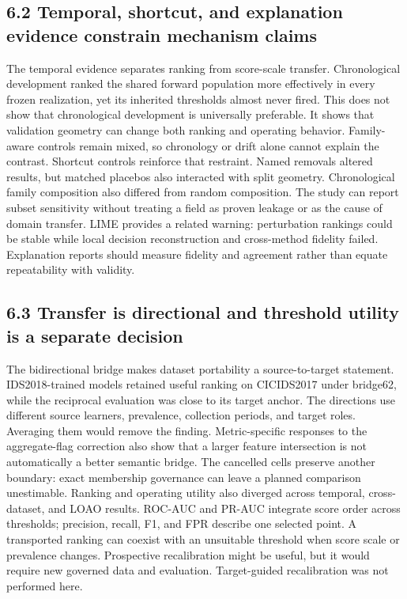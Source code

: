 \documentclass[preprint,12pt]{elsarticle}
\begin{document}
\subsection{6.2 Temporal, shortcut, and explanation evidence constrain mechanism claims}
The temporal evidence separates ranking from score-scale transfer. Chronological development ranked the shared forward population more effectively in every frozen realization, yet its inherited thresholds almost never fired. This does not show that chronological development is universally preferable. It shows that validation geometry can change both ranking and operating behavior. Family-aware controls remain mixed, so chronology or drift alone cannot explain the contrast.
Shortcut controls reinforce that restraint. Named removals altered results, but matched placebos also interacted with split geometry. Chronological family composition also differed from random composition. The study can report subset sensitivity without treating a field as proven leakage or as the cause of domain transfer. LIME provides a related warning: perturbation rankings could be stable while local decision reconstruction and cross-method fidelity failed. Explanation reports should measure fidelity and agreement rather than equate repeatability with validity.

\subsection{6.3 Transfer is directional and threshold utility is a separate decision}
The bidirectional bridge makes dataset portability a source-to-target statement. IDS2018-trained models retained useful ranking on CICIDS2017 under bridge62, while the reciprocal evaluation was close to its target anchor. The directions use different source learners, prevalence, collection periods, and target roles. Averaging them would remove the finding. Metric-specific responses to the aggregate-flag correction also show that a larger feature intersection is not automatically a better semantic bridge. The cancelled cells preserve another boundary: exact membership governance can leave a planned comparison unestimable.
Ranking and operating utility also diverged across temporal, cross-dataset, and LOAO results. ROC-AUC and PR-AUC integrate score order across thresholds; precision, recall, F1, and FPR describe one selected point. A transported ranking can coexist with an unsuitable threshold when score scale or prevalence changes. Prospective recalibration might be useful, but it would require new governed data and evaluation. Target-guided recalibration was not performed here.
\end{document}
